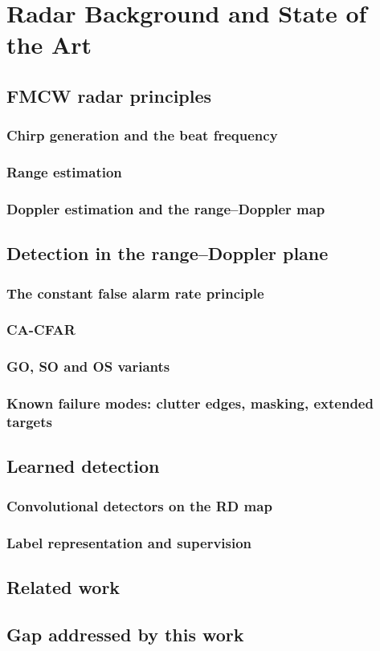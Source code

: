\chapter{Radar Background and State of the Art}
\label{ch:background}

\section{FMCW radar principles}
\subsection{Chirp generation and the beat frequency}
\subsection{Range estimation}
\subsection{Doppler estimation and the range--Doppler map}

\section{Detection in the range--Doppler plane}
\subsection{The constant false alarm rate principle}
\subsection{CA-CFAR}
\subsection{GO, SO and OS variants}
\subsection{Known failure modes: clutter edges, masking, extended targets}

\section{Learned detection}
\subsection{Convolutional detectors on the RD map}
\subsection{Label representation and supervision}

\section{Related work}

\section{Gap addressed by this work}

